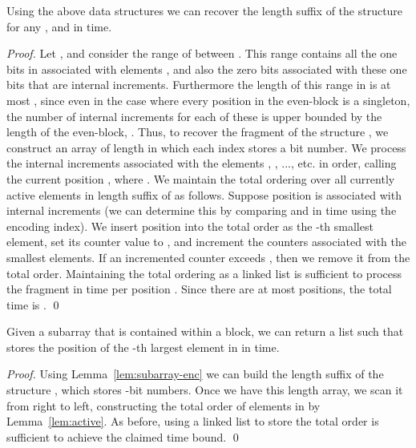 \documentclass[runningheads]{llncs}
\begin{document}
\begin{lemma}\label{lem:subarray-enc}
Using the above data structures we can recover the length  suffix
of the structure  for any ,  and  in  time.
\end{lemma}

\begin{proof}
Let , and consider the
range of  between .  This range
contains all the one bits in  associated with elements
, and also the zero bits associated
with these one bits that are internal increments.  Furthermore the
length of this range in  is at most , since
even in the case where every position in the even-block is a
singleton, the number of internal increments for each of these is
upper bounded by the length of the even-block, .  Thus, to recover
the fragment of the structure , we construct an array of
length  in which each index stores a 
bit number.  We process the internal increments associated with the
elements , , ..., etc. in order, calling the current
position , where . We maintain the total
ordering over all currently active elements in length 
suffix of  as follows.  Suppose position  is
associated with  internal increments (we can determine this by
comparing  and  in  time using the
encoding index).  We insert position  into the total order as
the -th smallest element, set its counter value to , and
increment the counters associated with the  smallest elements.  If
an incremented counter exceeds , then we remove it from the
total order.  Maintaining the total ordering as a linked list is
sufficient to process the fragment in  time per
position .  Since there are at most  positions, the
total time is . \qed
\end{proof}



\begin{lemma}\label{lem:subarray-query}
Given a subarray  that is contained within a block, we
can return a list  such that  stores the position of the
-th largest element in  in  time.
\end{lemma}

\begin{proof}
Using Lemma~\ref{lem:subarray-enc} we can build the length  suffix of the structure , which stores 
-bit numbers.  Once we have this length
 array, we scan it from right to left, constructing the total
order of elements in  by Lemma~\ref{lem:active}.  As
before, using a linked list to store the total order is sufficient to
achieve the claimed time bound. \qed
\end{proof}
\end{document}
